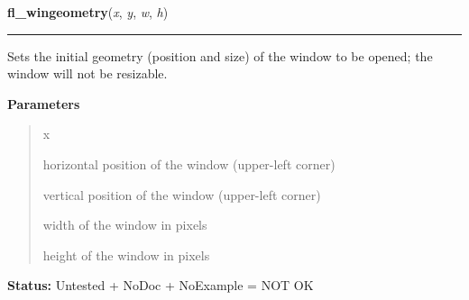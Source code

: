 \hspace{.8\funcindent}\begin{boxedminipage}{\funcwidth}

    \raggedright \textbf{fl\_wingeometry}(\textit{x}, \textit{y}, \textit{w}, \textit{h})

    \vspace{-1.5ex}

    \rule{\textwidth}{0.5\fboxrule}
\setlength{\parskip}{2ex}
    Sets the initial geometry (position and size) of the window to be 
    opened; the window will not be resizable.

\setlength{\parskip}{1ex}
      \textbf{Parameters}
      \vspace{-1ex}

      \begin{quote}
        \begin{Ventry}{x}

          \item[x]

          horizontal position of the window (upper-left corner)

          \item[y]

          vertical position of the window (upper-left corner)

          \item[w]

          width of the window in pixels

          \item[h]

          height of the window in pixels

        \end{Ventry}

      \end{quote}

\textbf{Status:} Untested + NoDoc + NoExample = NOT OK



    \end{boxedminipage}

    \label{xformslib:library:fl_wingeometry}

    \vspace{0.5ex}

